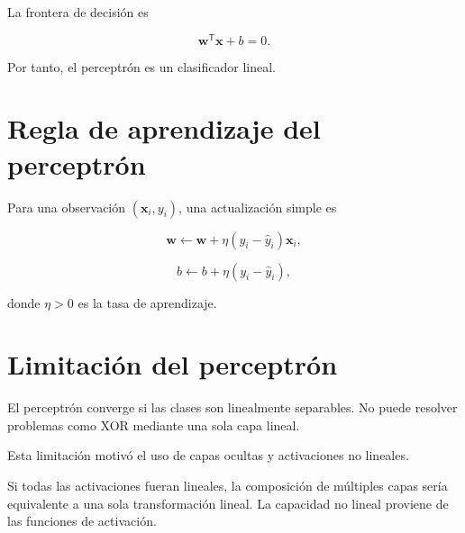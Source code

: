 \documentclass[
  spanish,
  10.5pt,
  letterpaper,
  DIV=11,
  numbers=noendperiod,
  oneside,
  open=any]{scrreprt}
\theoremstyle{definition}
\theoremstyle{definition}
\theoremstyle{plain}
\theoremstyle{remark}
\begin{document}

La frontera de decisión es

\[
\mathbf{w}^{\mathsf T}\mathbf{x}+b=0.
\]

Por tanto, el perceptrón es un clasificador lineal.

\section*{Regla de aprendizaje del
perceptrón}\label{regla-de-aprendizaje-del-perceptruxf3n}


Para una observación \((\mathbf{x}_i,y_i)\), una actualización simple es

\[
\mathbf{w}
\leftarrow
\mathbf{w}
+
\eta
\left(
y_i-\widehat{y}_i
\right)
\mathbf{x}_i,
\]

\[
b
\leftarrow
b
+
\eta
\left(
y_i-\widehat{y}_i
\right),
\]

donde \(\eta>0\) es la tasa de aprendizaje.

\section*{Limitación del
perceptrón}\label{limitaciuxf3n-del-perceptruxf3n}


El perceptrón converge si las clases son linealmente separables. No
puede resolver problemas como XOR mediante una sola capa lineal.

Esta limitación motivó el uso de capas ocultas y activaciones no
lineales.

\begin{tcolorbox}[enhanced jigsaw, arc=.35mm, bottomrule=.15mm, bottomtitle=1mm, breakable, colback=white, colbacktitle=quarto-callout-important-color!10!white, colframe=quarto-callout-important-color-frame, coltitle=black, left=2mm, leftrule=.75mm, opacityback=0, opacitybacktitle=0.6, rightrule=.15mm, title=\textcolor{quarto-callout-important-color}{\faExclamation}\hspace{0.5em}{Necesidad de no linealidad}, titlerule=0mm, toprule=.15mm, toptitle=1mm]

Si todas las activaciones fueran lineales, la composición de múltiples
capas sería equivalente a una sola transformación lineal. La capacidad
no lineal proviene de las funciones de activación.

\end{tcolorbox}
\end{document}
